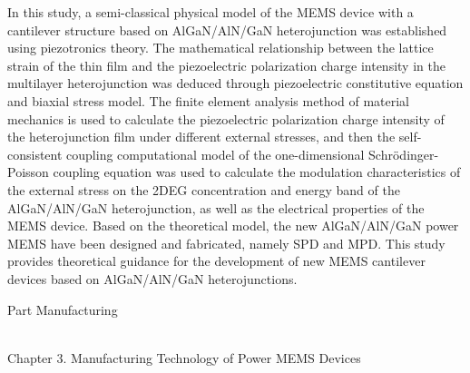 \noindent In this study, a semi-classical physical model of the MEMS  device with a cantilever  structure based on  AlGaN/AlN/GaN heterojunction was established using piezotronics  theory. The mathematical relationship between the lattice strain  of the thin film  and the piezoelectric polarization charge intensity  in the multilayer heterojunction was deduced through piezoelectric constitutive equation  and biaxial stress  model. The finite element analysis  method of material mechanics is used to calculate the piezoelectric polarization charge intensity of the heterojunction film under different external stresses, and then the self-consistent coupling computational model  of the one-dimensional Schrödinger-Poisson coupling equation  was used to calculate the modulation  characteristics of the external stress on the  2DEG concentration and energy band  of the AlGaN/AlN/GaN heterojunction, as well as the electrical properties of the MEMS device. Based on the theoretical model, the new AlGaN/AlN/GaN power MEMS have been designed and fabricated, namely  SPD and  MPD. This study provides theoretical guidance for the development of new MEMS cantilever  devices based on AlGaN/AlN/GaN heterojunctions.\\

\begin{large}
\centerline{Part \uppercase\expandafter{} \quad Manufacturing}
\end{large}

~\\

\noindent Chapter 3. Manufacturing Technology of Power MEMS Devices\\

